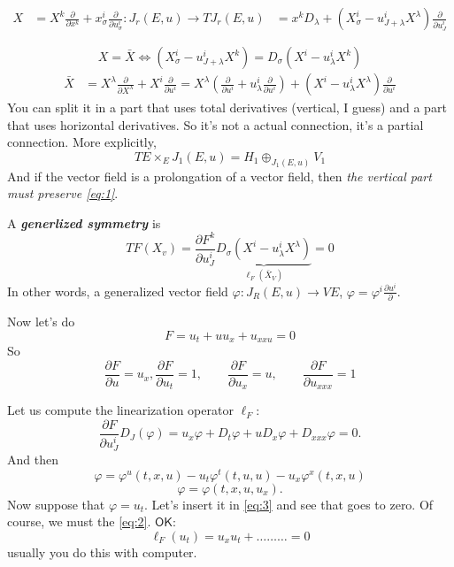 \begin{align*}X&=X^k \frac{\partial }{\partial x^k}+x^i_\sigma \frac{\partial }{\partial u^i_\sigma}:J_r(E,u)\to T J_r(E,u)
&=x^kD_\lambda+(X^i_\sigma-u^i_{J +\lambda}X^\lambda)\frac{\partial }{\partial u^i_J}
\end{align*}

\begin{equation}\label{eq:1}
X=\bar{X}\iff (X^i_\sigma-u^i_{J+\lambda}X^k)=D_\sigma(X^i-u^i_\lambda X^k)
\end{equation}
\begin{align*}
\bar{X}&=X^\lambda\frac{\partial }{\partial X^\lambda}+X^i\frac{\partial }{\partial u^i}=X^\lambda\left( \frac{\partial }{\partial u^i} +u^i_\lambda\frac{\partial }{\partial u^i}\right) +(X^i-u^i_\lambda X^\lambda)\frac{\partial }{\partial u^i}
\end{align*}
You can split it in a part that uses total derivatives (vertical, I guess) and a part that uses horizontal derivatives. So it's not a actual connection, it's a partial connection. More explicitly,
\[T E \times_E J_1(E,u)=H_1 \oplus_{J_1(E,u)}V_1\]
And if the vector field is a prolongation of a vector field, then \textit{the vertical part must preserve \cref{eq:1}}. 

A \textit{\textbf{generlized symmetry}} is
\[TF(X_v)=\frac{\partial F^k}{\partial u^i_J}\underbrace{D_\sigma(X^i-u^i_\lambda X^\lambda)}_{\ell_F(\bar{X}_V)}=0\]
In other words, a generalized vector field $\varphi:J_R(E,u)\to VE$, $\varphi=\varphi^i \frac{\partial  u^i}{\partial }$.

Now let's do
\begin{equation}\label{eq:2}F=u_t+u u_x + u_{x x u}=0\end{equation}
So
\[\frac{\partial F}{\partial u}=u_x, \frac{\partial F}{\partial u_t}=1,\qquad \frac{\partial F}{\partial u_x}=u	,\qquad \frac{\partial F}{\partial u_{x x x}}=1\]

Let us compute the linearization operator $\ell_F$:
\[\frac{\partial F}{\partial u^i_J}D_J (\varphi)=u_x\varphi+D_t \varphi+u D_x \varphi+ D_{x x x }\varphi=0.\]
And then
 \begin{equation}\label{eq:3}\varphi=\varphi^u(t,x,u)-u_t \varphi^t(t,u,u)-u_x \varphi^x(t,x,u)\end{equation}
 \[\varphi=\varphi(t,x,u,u_x).\]
Now suppose that $\varphi=u_t$. Let's insert it in  \cref{eq:3} and see that goes to zero. Of course, we must the \cref{eq:2}. $\mathsf{OK}$:
\[\ell_F(u_t)=u_xu_t+\ldots \ldots \ldots =0\]
usually you do this with computer.

